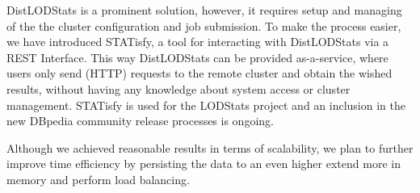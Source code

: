 DistLODStats is a prominent solution, however, it requires setup and managing of the the cluster configuration and job submission.
To make the process easier, we have introduced STATisfy, a tool for interacting with DistLODStats via a REST Interface.
This way DistLODStats can be provided as-a-service, where users only send (HTTP) requests to the remote cluster and obtain the wished results, without having any knowledge about system access or cluster management.
STATisfy is used for the LODStats project and an inclusion in the new DBpedia community release processes is ongoing.

Although we achieved reasonable results in terms of scalability, we plan to further improve time efficiency by persisting the data to an even higher extend more in memory and perform load balancing. 
